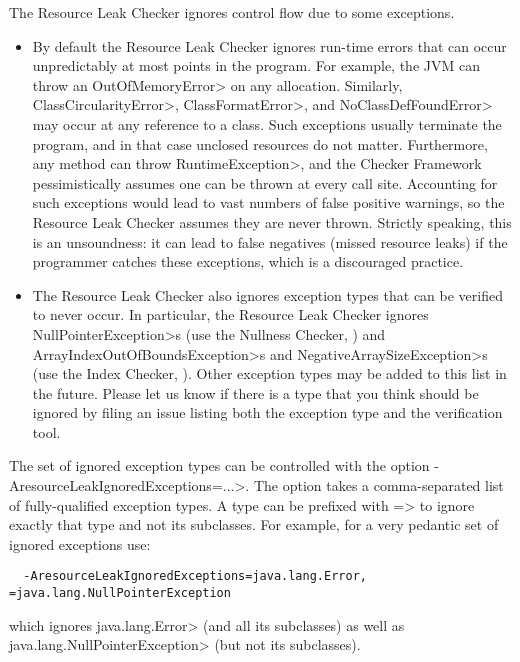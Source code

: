 The Resource Leak Checker ignores control flow due to some exceptions.

\begin{itemize}
\item
By default the Resource Leak Checker ignores run-time errors that can occur
unpredictably at most points in the program. For example, the JVM can throw
an \<OutOfMemoryError> on any allocation.  Similarly,
\<ClassCircularityError>, \<ClassFormatError>, and \<NoClassDefFoundError>
may occur at any reference to a class.  Such exceptions usually terminate
the program, and in that case unclosed resources do not matter.
Furthermore, any method can throw \<RuntimeException>, and the Checker
Framework pessimistically assumes one can be thrown at every call site.
Accounting for such exceptions would lead to vast numbers of
false positive warnings, so the Resource Leak Checker assumes they are
never thrown.  Strictly speaking, this is an unsoundness:  it can lead to
false negatives (missed resource leaks) if the programmer catches these
exceptions, which is a discouraged practice.

\item
The Resource Leak Checker also ignores exception types that can be verified
to never occur.  In particular, the Resource Leak Checker ignores \<NullPointerException>s
(use the Nullness Checker, ) and
\<ArrayIndexOutOfBoundsException>s and \<NegativeArraySizeException>s (use the Index
Checker, ). Other exception types may be added to this
list in the future.  Please let us know if there is a type that you think should
be ignored by filing an issue listing both the exception type and the
verification tool.
\end{itemize}

The set of ignored exception types can be controlled with the option
\<-AresourceLeakIgnoredExceptions=...>.  The option takes a comma-separated list of
fully-qualified exception types.  A type can be prefixed with \<=> to ignore exactly
that type and not its subclasses.  For example, for a very pedantic set of ignored
exceptions use:

\begin{verbatim}
  -AresourceLeakIgnoredExceptions=java.lang.Error, =java.lang.NullPointerException
\end{verbatim}

which ignores \<java.lang.Error> (and all its subclasses) as well as
\<java.lang.NullPointerException> (but not its subclasses).

